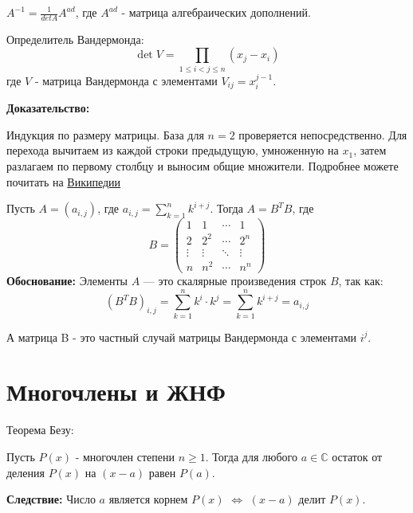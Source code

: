 \documentclass[12pt]{article}
\begin{document}
\begin{theorembox}
    $A^{-1} = \frac{1}{detA} A^{ad}$, где $A^{ad}$ - матрица алгебраических дополнений.
\end{theorembox}

\begin{theorembox}
    Определитель Вандермонда: 
    $$\det V = \prod_{1 \leq i < j \leq n} (x_j - x_i)$$
    где $V$ - матрица Вандермонда с элементами $V_{ij} = x_i^{j-1}$.

    \textbf{Доказательство:}
    
    Индукция по размеру матрицы. База для $n=2$ проверяется непосредственно. 
    Для перехода вычитаем из каждой строки предыдущую, умноженную на $x_1$, 
    затем разлагаем по первому столбцу и выносим общие множители. Подробнее можете почитать на \href{https://ru.wikipedia.org/wiki/%D0%9E%D0%BF%D1%80%D0%B5%D0%B4%D0%B5%D0%BB%D0%B8%D1%82%D0%B5%D0%BB%D1%8C_%D0%92%D0%B0%D0%BD%D0%B4%D0%B5%D1%80%D0%BC%D0%BE%D0%BD%D0%B4%D0%B0}{Википедии}
\end{theorembox}

\begin{examplebox}
    Пусть \( A = (a_{i,j}) \), где \( a_{i,j} = \sum_{k=1}^n k^{i+j} \). Тогда \( A = B^T B \), где
    \[
    B = 
    \begin{pmatrix}
    1 & 1 & \cdots & 1 \\
    2 & 2^2 & \cdots & 2^n \\
    \vdots & \vdots & \ddots & \vdots \\
    n & n^2 & \cdots & n^n
    \end{pmatrix}
    \]
    \textbf{Обоснование:}  
    Элементы \( A \) — это скалярные произведения строк \( B \), так как:
    \[
    (B^T B)_{i,j} = \sum_{k=1}^n k^i \cdot k^j = \sum_{k=1}^n k^{i+j} = a_{i,j}
    \]

    А матрица B - это частный случай матрицы Вандермонда с элементами $i^j$.
\end{examplebox}

\section{Многочлены и ЖНФ}

\begin{theorembox}
    Теорема Безу:
    
    Пусть $P(x)$ - многочлен степени $n \geq 1$. Тогда для любого $a \in \mathbb{C}$ остаток от деления $P(x)$ на $(x-a)$ равен $P(a)$.
    
    \textbf{Следствие:} Число $a$ является корнем $P(x)$ $\iff$ $(x-a)$ делит $P(x)$.
\end{theorembox}
\end{document}
